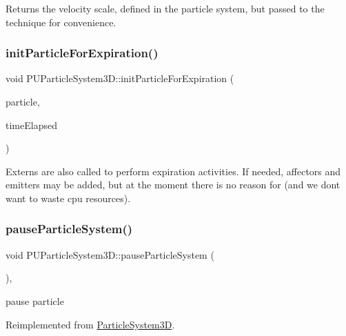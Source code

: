 Returns the velocity scale, defined in the particle system, but passed to the technique for convenience. \mbox{\label{classPUParticleSystem3D_af3b1378bee6fa5d3eaa4bc449be8828f}} 
\subsubsection{\texorpdfstring{init\+Particle\+For\+Expiration()}{initParticleForExpiration()}}
{\footnotesize\ttfamily void P\+U\+Particle\+System3\+D\+::init\+Particle\+For\+Expiration (\begin{DoxyParamCaption}\item[{\hyperlink{structPUParticle3D}{P\+U\+Particle3D} $\ast$}]{particle,  }\item[{float}]{time\+Elapsed }\end{DoxyParamCaption})\hspace{0.3cm}{\ttfamily [protected]}}

Externs are also called to perform expiration activities. If needed, affectors and emitters may be added, but at the moment there is no reason for (and we don\textquotesingle{}t want to waste cpu resources).\mbox{\label{classPUParticleSystem3D_aff7cc367d4a38e89a3935e6a3b5a482f}} 
\subsubsection{\texorpdfstring{pause\+Particle\+System()}{pauseParticleSystem()}\hspace{0.1cm}{\footnotesize\ttfamily [1/2]}}
{\footnotesize\ttfamily void P\+U\+Particle\+System3\+D\+::pause\+Particle\+System (\begin{DoxyParamCaption}{ }\end{DoxyParamCaption})\hspace{0.3cm}{\ttfamily [override]}, {\ttfamily [virtual]}}

pause particle 

Reimplemented from \hyperlink{classParticleSystem3D_ade8abd1ad8b534b6c8485aa43ed8c78e}{Particle\+System3D}.

